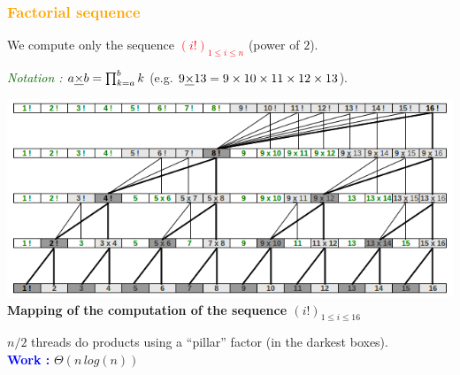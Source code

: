 
\begin{frame}[fragile]
\frametitle{\textbf{\textcolor{orange}{Factorial sequence}}}

\begin{block}{}
We compute only the sequence \textcolor{red}{$(i!)_{1 \leq i \leq n}$} (power of $2$).

\textit{\textcolor{darkgreen}{Notation :}} $a \underline{\bf{\times}} b = \prod_{k=a}^{b} k$ (e.g. $9 \underline{\bf{\times}} 13 = 9 \times 10 \times 11 \times 12 \times 13$).
\end{block}

\begin{center}
\includegraphics[scale = 0.273]{facto.png}\\
\textbf{Mapping of the computation of the sequence $(i!)_{1 \leq i \leq 16}$}
\end{center}

$n/2$ threads do products using a ``pillar'' factor (in the darkest boxes).\\
\textcolor{blue}{\textbf{Work :}} $\Theta(n\,log(n))$

\end{frame}



%

